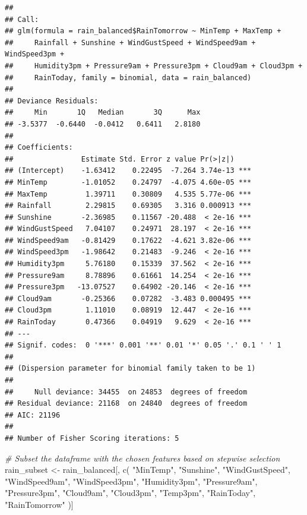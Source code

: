 \documentclass[
]{article}
\newenvironment{Shaded}{\begin{snugshade}}{\end{snugshade}}
\newcommand{\CommentTok}[1]{\textcolor[rgb]{0.56,0.35,0.01}{\textit{#1}}}
\newcommand{\FunctionTok}[1]{\textcolor[rgb]{0.00,0.00,0.00}{#1}}
\newcommand{\NormalTok}[1]{#1}
\newcommand{\OtherTok}[1]{\textcolor[rgb]{0.56,0.35,0.01}{#1}}
\newcommand{\StringTok}[1]{\textcolor[rgb]{0.31,0.60,0.02}{#1}}
\begin{document}
\begin{verbatim}
## 
## Call:
## glm(formula = rain_balanced$RainTomorrow ~ MinTemp + MaxTemp + 
##     Rainfall + Sunshine + WindGustSpeed + WindSpeed9am + WindSpeed3pm + 
##     Humidity3pm + Pressure9am + Pressure3pm + Cloud9am + Cloud3pm + 
##     RainToday, family = binomial, data = rain_balanced)
## 
## Deviance Residuals: 
##     Min       1Q   Median       3Q      Max  
## -3.5377  -0.6440  -0.0412   0.6411   2.8180  
## 
## Coefficients:
##                Estimate Std. Error z value Pr(>|z|)    
## (Intercept)    -1.63412    0.22495  -7.264 3.74e-13 ***
## MinTemp        -1.01052    0.24797  -4.075 4.60e-05 ***
## MaxTemp         1.39711    0.30809   4.535 5.77e-06 ***
## Rainfall        2.29815    0.69305   3.316 0.000913 ***
## Sunshine       -2.36985    0.11567 -20.488  < 2e-16 ***
## WindGustSpeed   7.04107    0.24971  28.197  < 2e-16 ***
## WindSpeed9am   -0.81429    0.17622  -4.621 3.82e-06 ***
## WindSpeed3pm   -1.98642    0.21483  -9.246  < 2e-16 ***
## Humidity3pm     5.76180    0.15339  37.562  < 2e-16 ***
## Pressure9am     8.78896    0.61661  14.254  < 2e-16 ***
## Pressure3pm   -13.07527    0.64902 -20.146  < 2e-16 ***
## Cloud9am       -0.25366    0.07282  -3.483 0.000495 ***
## Cloud3pm        1.11010    0.08919  12.447  < 2e-16 ***
## RainToday       0.47366    0.04919   9.629  < 2e-16 ***
## ---
## Signif. codes:  0 '***' 0.001 '**' 0.01 '*' 0.05 '.' 0.1 ' ' 1
## 
## (Dispersion parameter for binomial family taken to be 1)
## 
##     Null deviance: 34455  on 24853  degrees of freedom
## Residual deviance: 21168  on 24840  degrees of freedom
## AIC: 21196
## 
## Number of Fisher Scoring iterations: 5
\end{verbatim}

\begin{Shaded}
\begin{Highlighting}[]
\CommentTok{\# Subset the dataframe with the chosen features based on stepwise selection}
\NormalTok{rain\_subset }\OtherTok{\textless{}{-}}
\NormalTok{  rain\_balanced[, }\FunctionTok{c}\NormalTok{(}
    \StringTok{"MinTemp"}\NormalTok{,}
    \StringTok{"Sunshine"}\NormalTok{,}
    \StringTok{"WindGustSpeed"}\NormalTok{,}
    \StringTok{"WindSpeed9am"}\NormalTok{,}
    \StringTok{"WindSpeed3pm"}\NormalTok{,}
    \StringTok{"Humidity3pm"}\NormalTok{,}
    \StringTok{"Pressure9am"}\NormalTok{,}
    \StringTok{"Pressure3pm"}\NormalTok{,}
    \StringTok{"Cloud9am"}\NormalTok{,}
    \StringTok{"Cloud3pm"}\NormalTok{,}
    \StringTok{"Temp3pm"}\NormalTok{,}
    \StringTok{"RainToday"}\NormalTok{,}
    \StringTok{"RainTomorrow"}
\NormalTok{  )]}
\end{Highlighting}
\end{Shaded}
\end{document}
